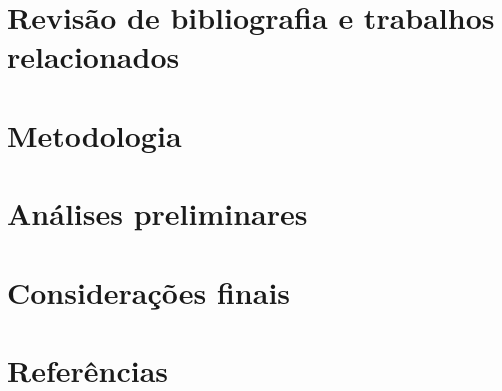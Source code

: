 \documentclass[12pt]{article}
\begin{document}






\section{Revisão de bibliografia e trabalhos relacionados}


\section{Metodologia}


\section{Análises preliminares}


\section{Considerações finais}


\section{Referências}


\end{document}
